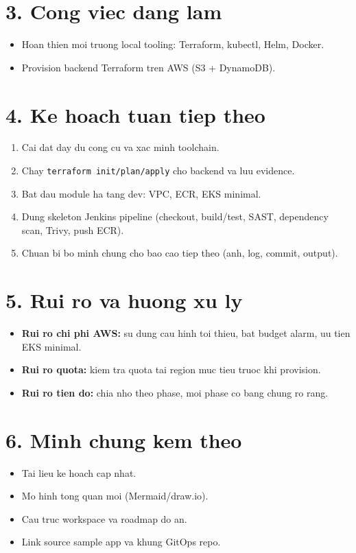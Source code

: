 \documentclass[12pt,a4paper]{article}
\begin{document}
\section*{3. Cong viec dang lam}
\begin{itemize}[leftmargin=*]
  \item Hoan thien moi truong local tooling: Terraform, kubectl, Helm, Docker.
  \item Provision backend Terraform tren AWS (S3 + DynamoDB).
\end{itemize}

\section*{4. Ke hoach tuan tiep theo}
\begin{enumerate}[leftmargin=*]
  \item Cai dat day du cong cu va xac minh toolchain.
  \item Chay \texttt{terraform init/plan/apply} cho backend va luu evidence.
  \item Bat dau module ha tang dev: VPC, ECR, EKS minimal.
  \item Dung skeleton Jenkins pipeline (checkout, build/test, SAST, dependency scan, Trivy, push ECR).
  \item Chuan bi bo minh chung cho bao cao tiep theo (anh, log, commit, output).
\end{enumerate}

\section*{5. Rui ro va huong xu ly}
\begin{itemize}[leftmargin=*]
  \item \textbf{Rui ro chi phi AWS:} su dung cau hinh toi thieu, bat budget alarm, uu tien EKS minimal.
  \item \textbf{Rui ro quota:} kiem tra quota tai region muc tieu truoc khi provision.
  \item \textbf{Rui ro tien do:} chia nho theo phase, moi phase co bang chung ro rang.
\end{itemize}

\section*{6. Minh chung kem theo}
\begin{itemize}[leftmargin=*]
  \item Tai lieu ke hoach cap nhat.
  \item Mo hinh tong quan moi (Mermaid/draw.io).
  \item Cau truc workspace va roadmap do an.
  \item Link source sample app va khung GitOps repo.
\end{itemize}
\end{document}
